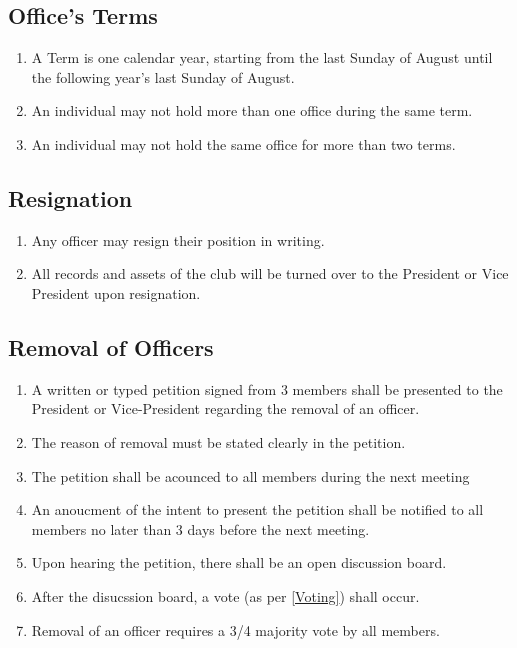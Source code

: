 \documentclass[a4paper,12pt]{article}
\begin{document}
\subsection{Office's Terms}
\begin{enumerate}
  \item A Term is one calendar year, starting from the last Sunday of August until the following year's last Sunday of August.
  \item An individual may not hold more than one office during the same term.
  \item An individual may not hold the same office for more than two terms.
\end{enumerate}

\subsection{Resignation}
\begin{enumerate}
  \item Any officer may resign their position in writing.
  \item All records and assets of the club will be turned over to the President or Vice President upon resignation.
\end{enumerate}

\subsection{Removal of Officers} \label{officer-removal}
\begin{enumerate}
  \item A written or typed petition signed from 3 members shall be presented to the President or Vice-President regarding the removal of an officer.
  \item The reason of removal must be stated clearly in the petition.
  \item The petition shall be acounced to all members during the next meeting
  \item An anoucment of the intent to present the petition shall be notified to all members no later than 3 days before the next meeting.
  \item Upon hearing the petition, there shall be an open discussion board.
  \item After the disucssion board, a vote (as per \cref{Voting}) shall occur. 
  \item Removal of an officer requires a 3/4 majority vote by all members.
\end{enumerate}
\end{document}
